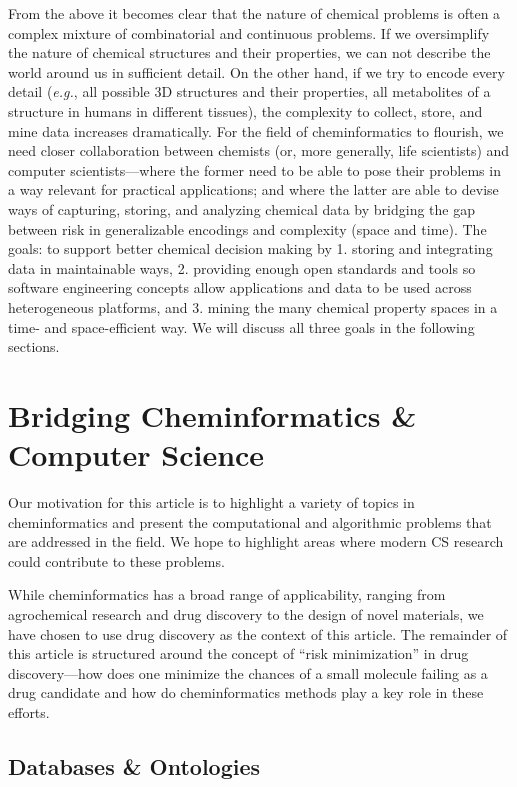 \documentclass{sig-alternate}
\begin{document}
From the above it becomes clear that the nature of chemical problems
is often a complex mixture of combinatorial and continuous
problems. If we oversimplify the nature of chemical structures and
their properties, we can not describe the world around us in
sufficient detail. On the other hand, if we try to encode every detail
(\emph{e.g.}, all possible 3D structures and their properties, all
metabolites of a structure in humans in different tissues), the
complexity to collect, store, and mine data increases
dramatically. For the field of cheminformatics to flourish, we need
closer collaboration between chemists (or, more generally, life
scientists) and computer scientists---where the former need to be able
to pose their problems in a way relevant for practical applications;
and where the latter are able to devise ways of capturing, storing,
and analyzing chemical data by bridging the gap between risk in
generalizable encodings and complexity (space and time). The goals: to
support better chemical decision making by 1. storing and integrating
data in maintainable ways, 2.  providing enough open standards and
tools so software engineering concepts allow applications and data to
be used across heterogeneous platforms, and 3. mining the many
chemical property spaces in a time- and space-efficient way. We will
discuss all three goals in the following sections.

\section{Bridging Cheminformatics \& Computer Science}

Our motivation for this article is to highlight a variety of topics in
cheminformatics and present the computational and algorithmic problems
that are addressed in the field. We hope to
highlight areas where modern CS research could contribute to these
problems.

While cheminformatics has a broad range of applicability, ranging from
agrochemical research and drug discovery to the design of novel
materials, we have chosen to use drug discovery as the context of this
article. The remainder of this article is structured around the
concept of ``risk minimization'' in drug discovery---how does one
minimize the chances of a small molecule failing as a drug candidate
and how do cheminformatics methods play a key role in these efforts.

\subsection{Databases \& Ontologies}
\end{document}
